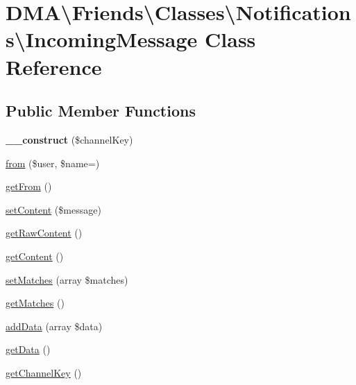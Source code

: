 \hypertarget{classDMA_1_1Friends_1_1Classes_1_1Notifications_1_1IncomingMessage}{}\section{D\+M\+A\textbackslash{}Friends\textbackslash{}Classes\textbackslash{}Notifications\textbackslash{}Incoming\+Message Class Reference}
\label{classDMA_1_1Friends_1_1Classes_1_1Notifications_1_1IncomingMessage}
\subsection*{Public Member Functions}
\begin{DoxyCompactItemize}
\item 
\hypertarget{classDMA_1_1Friends_1_1Classes_1_1Notifications_1_1IncomingMessage_a859682e7cd422373fd51aeb05e4a8ecd}{}{\bfseries \+\_\+\+\_\+construct} (\$channel\+Key)\label{classDMA_1_1Friends_1_1Classes_1_1Notifications_1_1IncomingMessage_a859682e7cd422373fd51aeb05e4a8ecd}

\item 
\hyperlink{classDMA_1_1Friends_1_1Classes_1_1Notifications_1_1IncomingMessage_a2a37952bdb070d65012f6895d0abd542}{from} (\$user, \$name=\textquotesingle{}\textquotesingle{})
\item 
\hyperlink{classDMA_1_1Friends_1_1Classes_1_1Notifications_1_1IncomingMessage_a5d7b4a3a75d403ba5e3f250dbe6bb1fc}{get\+From} ()
\item 
\hyperlink{classDMA_1_1Friends_1_1Classes_1_1Notifications_1_1IncomingMessage_a120b5ebba73260b40a0b6a820e26862d}{set\+Content} (\$message)
\item 
\hyperlink{classDMA_1_1Friends_1_1Classes_1_1Notifications_1_1IncomingMessage_aadc7710a506f38776f93ef4beb64e01b}{get\+Raw\+Content} ()
\item 
\hyperlink{classDMA_1_1Friends_1_1Classes_1_1Notifications_1_1IncomingMessage_a6c870deb4ee36765884d7c7e70d79203}{get\+Content} ()
\item 
\hyperlink{classDMA_1_1Friends_1_1Classes_1_1Notifications_1_1IncomingMessage_a1a9c1b9b62e4601d0f31ee1c2e4c9272}{set\+Matches} (array \$matches)
\item 
\hyperlink{classDMA_1_1Friends_1_1Classes_1_1Notifications_1_1IncomingMessage_a55e79b4061799e19ce96a13b5b59f4a6}{get\+Matches} ()
\item 
\hyperlink{classDMA_1_1Friends_1_1Classes_1_1Notifications_1_1IncomingMessage_a9fd9a20192b9afc5000660391ebf3a01}{add\+Data} (array \$data)
\item 
\hyperlink{classDMA_1_1Friends_1_1Classes_1_1Notifications_1_1IncomingMessage_a13920ffca0f167439137e3766187dc3e}{get\+Data} ()
\item 
\hyperlink{classDMA_1_1Friends_1_1Classes_1_1Notifications_1_1IncomingMessage_a9a6d0d32bb31053a0880db8886001c41}{get\+Channel\+Key} ()
\end{DoxyCompactItemize}
